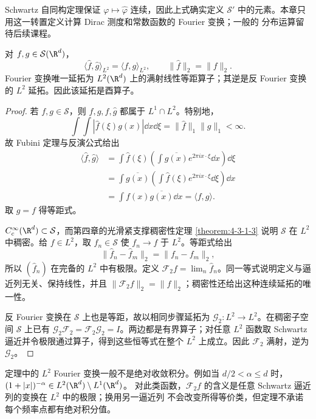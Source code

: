 Schwartz 自同构定理保证 $\varphi\mapsto\widehat\varphi$ 连续，因此上式确实定义
$\mathcal S'$ 中的元素。本章只用这一转置定义计算 Dirac 测度和常数函数的 Fourier 变换；一般的
分布运算留待后续课程。

\begin{theorem}[Plancherel 定理]\label{theorem:7-2-3-2}
对 $f,g\in\mathcal S(\R^d)$，
\begin{equation}\label{eq:7-2-euclidean-parseval}
 \langle\widehat f,\widehat g\rangle_{L^2}
 =\langle f,g\rangle_{L^2},
 \qquad \|\widehat f\|_2=\|f\|_2.
\end{equation}
Fourier 变换唯一延拓为 $L^2(\R^d)$ 上的满射线性等距算子；其逆是反 Fourier 变换的
$L^2$ 延拓。因此该延拓是酉算子。
\end{theorem}

\begin{proof}
若 $f,g\in\mathcal S$，则 $f,g,\widehat f,\widehat g$ 都属于 $L^1\cap L^2$。特别地，
\[
 \int\!\!\int|\widehat f(\xi)g(x)|\dd x\dd\xi
 =\|\widehat f\|_1\|g\|_1<\infty.
\]
故 Fubini 定理与反演公式给出
\begin{align*}
 \langle\widehat f,\widehat g\rangle
 &=\int\widehat f(\xi)
   \left(\int\overline{g(x)}e^{2\pi ix\cdot\xi}\dd x\right)\dd\xi\\
 &=\int\overline{g(x)}
   \left(\int\widehat f(\xi)e^{2\pi ix\cdot\xi}\dd\xi\right)\dd x\\
 &=\int f(x)\overline{g(x)}\dd x
 =\langle f,g\rangle.
\end{align*}
取 $g=f$ 得等距式。

$C_c^\infty(\R^d)\subset\mathcal S$，而第四章的光滑紧支撑稠密性定理
\ref{theorem:4-3-1-3} 说明 $\mathcal S$ 在 $L^2$ 中稠密。给 $f\in L^2$，取
$f_n\in\mathcal S$ 使 $f_n\to f$ 于 $L^2$。等距式给出
\[
 \|\widehat f_n-\widehat f_m\|_2=\|f_n-f_m\|_2,
\]
所以 $(\widehat f_n)$ 在完备的 $L^2$ 中有极限。定义
$\mathcal F_2f=\lim_n\widehat f_n$。同一等式说明定义与逼近列无关、保持线性，并且
$\|\mathcal F_2f\|_2=\|f\|_2$；稠密性还给出这种连续延拓的唯一性。

反 Fourier 变换在 $\mathcal S$ 上也是等距，故以相同步骤延拓为
$\mathcal G_2:L^2\to L^2$。在稠密子空间 $\mathcal S$ 上已有
$\mathcal G_2\mathcal F_2=\mathcal F_2\mathcal G_2=I$。两边都是有界算子；对任意 $L^2$
函数取 Schwartz 逼近并令极限通过算子，得到这些恒等式在整个 $L^2$ 上成立。因此
$\mathcal F_2$ 满射，逆为 $\mathcal G_2$。
\end{proof}

定理中的 $L^2$ Fourier 变换一般不是绝对收敛积分。例如当
$d/2<\alpha\leq d$ 时，$(1+|x|)^{-\alpha}\in L^2(\R^d)\setminus L^1(\R^d)$。
对此类函数，$\mathcal F_2f$ 的含义是任意 Schwartz 逼近列的变换在 $L^2$ 中的极限；换用另一逼近列
不会改变所得等价类，但定理不承诺每个频率点都有绝对积分值。


